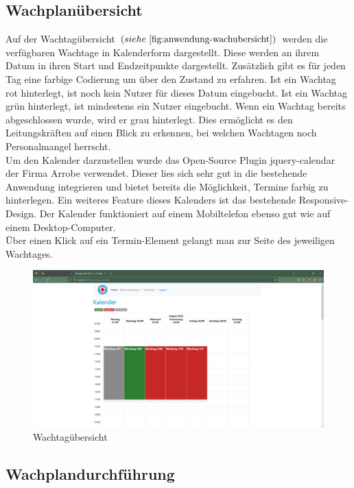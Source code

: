 \documentclass[fontsize=12pt,openright,oneside,paper=a4,BCOR=1cm]{scrbook}
\begin{document}
\subsection{Wachplanübersicht}

Auf der Wachtag\"ubersicht $(siehe~\ref{fig:anwendung-wachubersicht})$ werden die verf\"ugbaren Wachtage in Kalenderform dargestellt. Diese werden an ihrem Datum in ihren Start und Endzeitpunkte dargestellt. Zus\"atzlich gibt es f\"ur jeden Tag eine farbige Codierung um \"uber den Zustand zu erfahren. Ist ein Wachtag rot hinterlegt, ist noch kein Nutzer f\"ur dieses Datum eingebucht. Ist ein Wachtag gr\"un hinterlegt, ist mindestens ein Nutzer eingebucht. Wenn ein Wachtag bereits abgeschlossen wurde, wird er grau hinterlegt. Dies erm\"oglicht es den Leitungskr\"aften auf einen Blick zu erkennen, bei welchen Wachtagen noch Personalmangel herrscht. \\
Um den Kalender darzustellen wurde das Open-Source Plugin \glqq jquery-calendar\grqq{} der Firma \glqq Arrobe\grqq{} verwendet. Dieser lies sich sehr gut in die bestehende Anwendung integrieren und bietet bereits die M\"oglichkeit, Termine farbig zu hinterlegen. Ein weiteres Feature dieses Kalenders ist das bestehende Responsive-Design. Der Kalender funktioniert auf einem Mobiltelefon ebenso gut wie auf einem Desktop-Computer. \\
\"Uber einen Klick auf ein Termin-Element gelangt man zur Seite des jeweiligen Wachtages.

\begin{figure}[H]
  \centering
    \includegraphics[width=0.7\linewidth]{Anlagen/Anwendung/7UebersichtGebucht.png}
    \caption{Wachtag\"ubersicht}
  \label{fig:anwendung-wachubersicht}
\end{figure}

\subsection {Wachplandurchführung}
\end{document}

